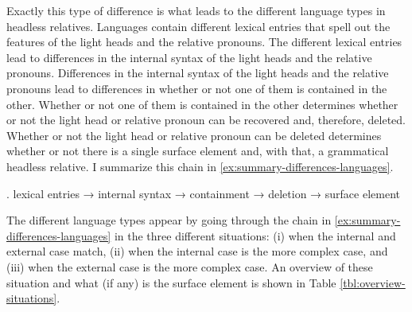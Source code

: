 Exactly this type of difference is what leads to the different language types in headless relatives. Languages contain different lexical entries that spell out the features of the light heads and the relative pronouns.
The different lexical entries lead to differences in the internal syntax of the light heads and the relative pronouns.
Differences in the internal syntax of the light heads and the relative pronouns lead to differences in whether or not one of them is contained in the other.
Whether or not one of them is contained in the other determines whether or not the light head or relative pronoun can be recovered and, therefore, deleted.
Whether or not the light head or relative pronoun can be deleted determines whether or not there is a single surface element and, with that, a grammatical headless relative.
I summarize this chain in \ref{ex:summary-differences-languages}.

\ex.\label{ex:summary-differences-languages} lexical entries → internal syntax → containment → deletion → surface element

The different language types appear by going through the chain in \ref{ex:summary-differences-languages} in the three different situations: (i) when the internal and external case match, (ii) when the internal case is the more complex case, and (iii) when the external case is the more complex case. An overview of these situation and what (if any) is the surface element is shown in Table \ref{tbl:overview-situations}.

